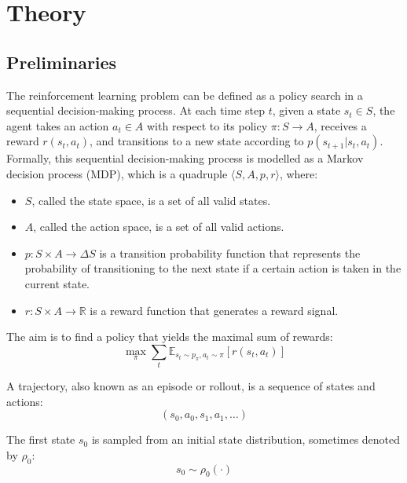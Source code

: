\newpage
\section{Theory} \label{sec:theory}
{
\setlength{\parindent}{0pt}
\setlength{\parskip}{1.5ex}

\subsection{Preliminaries}

The reinforcement learning problem can be defined as a policy search in a sequential decision-making process. At each time step $t$, given a state $s_t \in S$, the agent takes an action $a_t \in A$ with respect to its policy $\pi \colon S \to A$, receives a reward $r(s_t, a_t)$, and transitions to a new state according to $p(s_{t+1}|s_t, a_t)$. Formally, this sequential decision-making process is modelled as a Markov decision process (MDP), which is a quadruple $\langle S, A, p, r \rangle$, where:
\begin{itemize}
\item $S$, called the state space, is a set of all valid states.
\item $A$, called the action space, is a set of all valid actions.
\item $p \colon S \times A \to \Delta S$ is a transition probability function that represents the probability of transitioning to the next state if a certain action is taken in the current state.
\item $r \colon S \times A \to \mathbb{R}$ is a reward function that generates a reward signal.
\end{itemize}

The aim is to find a policy that yields the maximal sum of rewards:
\begin{displaymath}
\max_{\pi} \sum_{t} \mathbb{E}_{s_t \sim p_\pi, a_t \sim \pi} \left[ r(s_t,a_t) \right]
\end{displaymath}

A trajectory, also known as an episode or rollout, is a sequence of states and actions:
\begin{displaymath}
(s_0, a_0, s_1, a_1, \ldots)
\end{displaymath}

The first state $s_0$ is sampled from an initial state distribution, sometimes denoted by $\rho_0$:
\begin{displaymath}
s_0 \sim \rho_0(\cdot)
\end{displaymath}

}
